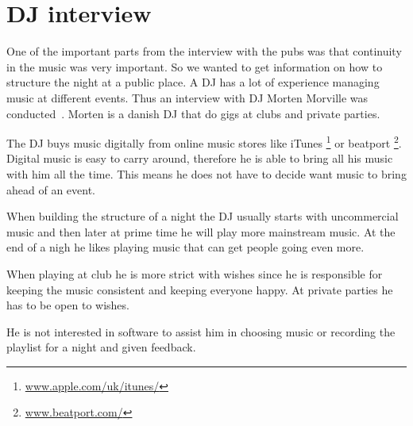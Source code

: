 \section{DJ interview}
One of the important parts from the interview with the pubs was that continuity in the music was very important. So we wanted to get information on how to structure the night at a public place. A DJ has a lot of experience managing music at different events. Thus an interview with DJ Morten Morville was conducted~\cite{int_dj}. Morten is a danish DJ that do gigs at clubs and private parties.


The DJ buys music digitally from online music stores like iTunes \footnote{\url{www.apple.com/uk/itunes/}} or beatport \footnote{\url{www.beatport.com/}}. Digital music is easy to carry around, therefore he is able to bring all his music with him all the time. This means he does not have to decide want music to bring ahead of an event. 

When building the structure of a night the DJ usually starts with uncommercial music and then later at prime time he will play more mainstream music. At the end of a nigh he likes playing music that can get people going even more.

When playing at club he is more strict with wishes since he is responsible for keeping the music consistent and keeping everyone happy. At private parties he has to be open to wishes.

He is not interested in software to assist him in choosing music or recording the playlist for a night and given feedback.

